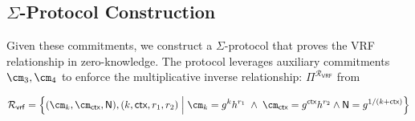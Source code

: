 \subsection{$\Sigma$-Protocol Construction}
Given these commitments, we construct a $\Sigma$-protocol that proves the VRF relationship in zero-knowledge. The protocol leverages auxiliary commitments $\cm_3, \cm_4$
to enforce the multiplicative inverse relationship: $\Pi^{\mathcal{R}_{\textsf{VRF}}}$ from 

    \[
        \mathcal{R}_{\mathsf{vrf}} = \left\{ (\cm_k, \cm_{\textsf{ctx}}, \mathsf{N}), (k, \textsf{ctx}, r_1, r_2) \; \Big| \;  \cm_k = g^k h^{r_1} \; \land \;
                \cm_{\textsf{ctx}} = g^{\textsf{ctx}} h^{r_2} \land \textsf{N} = g^{1/(k + \textsf{ctx})} \right\}
    \]



